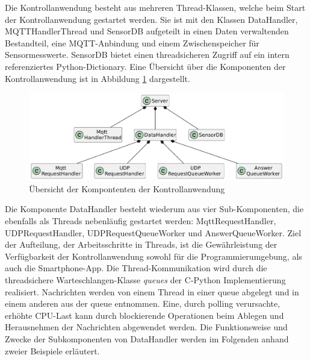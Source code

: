 \documentclass[11pt,a4paper]{report}
\begin{document}
Die Kontrollanwendung besteht aus mehreren Thread-Klassen, welche beim Start der Kontrollanwendung gestartet werden.
Sie ist mit den Klassen DataHandler, MQTTHandlerThread und SensorDB aufgeteilt in einen Daten verwaltenden Bestandteil, eine MQTT-Anbindung und einem Zwischenspeicher für Sensormesswerte.
SensorDB bietet einen threadsicheren Zugriff auf ein intern referenziertes Python-Dictionary.
Eine Übersicht über die Komponenten der Kontrollanwendung ist in Abbildung \ref{fig:serverUml} dargestellt.
\begin{figure}[htbp]
  \centering
  \includegraphics[width=\textwidth]{images/ServerUml}
  \caption{Übersicht der Kompontenten der Kontrollanwendung}
  \label{fig:serverUml}
\end{figure}

Die Komponente DataHandler besteht wiederum aus vier Sub-Komponenten, die ebenfalls als Threads nebenläufig gestartet werden: MqttRequestHandler, UDPRequestHandler, UDPRequestQueueWorker und AnswerQueueWorker.
Ziel der Aufteilung, der Arbeitsschritte in Threads, ist die Gewährleistung der Verfügbarkeit der Kontrollanwendung sowohl für die Programmierumgebung, als auch die Smartphone-App.
Die Thread-Kommunikation wird durch die threadsichere Warteschlangen-Klasse \textit{queues} \cite{python_queue} der C-Python Implementierung realisiert.
Nachrichten werden von einem Thread in einer queue abgelegt und in einem anderen aus der queue entnommen.
Eine, durch polling verursachte, erhöhte CPU-Last kann durch blockierende Operationen beim Ablegen und Herausnehmen der Nachrichten abgewendet werden.
Die Funktionsweise und Zwecke der Subkomponenten von DataHandler werden im Folgenden anhand zweier Beispiele erläutert.
\end{document}
